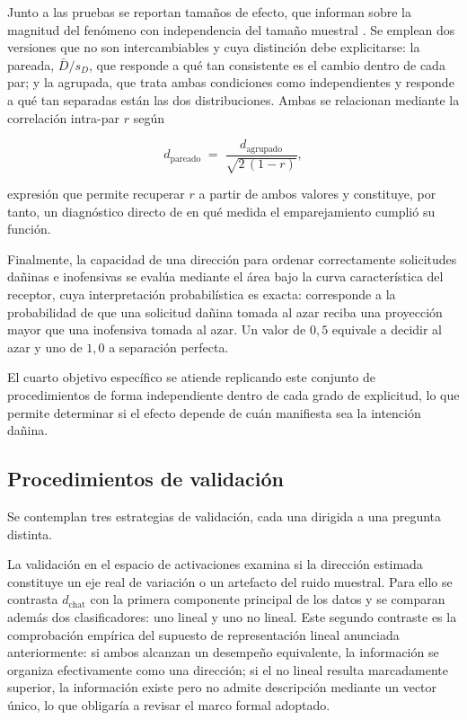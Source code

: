 Junto a las pruebas se reportan tamaños de efecto, que informan sobre la
magnitud del fenómeno con independencia del tamaño muestral \parencite{cohen1988}.
Se emplean dos versiones que no son intercambiables y cuya distinción debe
explicitarse: la pareada, $\bar{D}/s_D$, que responde a qué tan consistente es
el cambio dentro de cada par; y la agrupada, que trata ambas condiciones como
independientes y responde a qué tan separadas están las dos distribuciones. Ambas
se relacionan mediante la correlación intra-par $r$ según

\begin{equation}
  d_{\text{pareado}} \;=\; \frac{d_{\text{agrupado}}}{\sqrt{2\,(1-r)}},
  \label{eq:relacion-d}
\end{equation}

\noindent
expresión que permite recuperar $r$ a partir de ambos valores y constituye, por
tanto, un diagnóstico directo de en qué medida el emparejamiento cumplió su
función.

Finalmente, la capacidad de una dirección para ordenar correctamente
solicitudes dañinas e inofensivas se evalúa mediante el área bajo la curva
característica del receptor, cuya interpretación probabilística es exacta:
corresponde a la probabilidad de que una solicitud dañina tomada al azar reciba
una proyección mayor que una inofensiva tomada al azar. Un valor de $0{,}5$
equivale a decidir al azar y uno de $1{,}0$ a separación perfecta.

El cuarto objetivo específico se atiende replicando este conjunto de
procedimientos de forma independiente dentro de cada grado de explicitud, lo
que permite determinar si el efecto depende de cuán manifiesta sea la intención
dañina.

\subsection{Procedimientos de validación}
\label{subsec:validacion}

Se contemplan tres estrategias de validación, cada una dirigida a una pregunta
distinta.

La validación en el espacio de activaciones examina si la dirección estimada
constituye un eje real de variación o un artefacto del ruido muestral. Para
ello se contrasta $d_{\text{chat}}$ con la primera componente principal de los
datos y se comparan además dos clasificadores: uno lineal y uno no lineal. Este
segundo contraste es la comprobación empírica del supuesto de representación
lineal anunciada anteriormente: si ambos alcanzan un desempeño equivalente, la
información se organiza efectivamente como una dirección; si el no lineal
resulta marcadamente superior, la información existe pero no admite descripción
mediante un vector único, lo que obligaría a revisar el marco formal adoptado.

